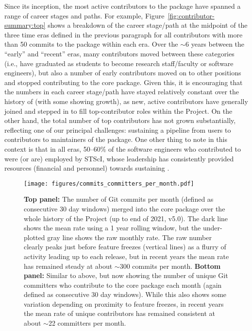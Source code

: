 \documentclass[modern]{aastex631}
\begin{document}
Since its inception, the most active contributors to the \astropypkg package
have spanned a range of career stages and paths.
For example, Figure~\ref{fig:contributor-summary:top} shows a breakdown of the
career stage/path at the midpoint of the three time eras defined in the previous
paragraph for all contributors with more than 50 commits to the \astropypkg
package within each era.
Over the $\sim$6 years between the ``early'' and ``recent'' eras, many
contributors moved between these categories (i.e., have graduated as students to
become research staff/faculty or software engineers), but also a number of
early contributors moved on to other positions and stopped contributing to the
core \astropypkg package.
Given this, it is encouraging that the numbers in each career stage/path have
stayed relatively constant over the history of \astropy (with some showing
growth), as new, active contributors have generally joined and stepped in to
fill top-contributor roles within the Project.
On the other hand, the total number of top contributors has not grown
substantially, reflecting one of our principal challenges: sustaining a pipeline
from users to contributors to maintainers of the package.
One other thing to note in this context is that in all eras, 50--60\% of the
software engineers who contributed to \astropypkg were (or are) employed by
STScI, whose leadership has consistently provided resources (financial and
personnel) towards sustaining \astropy.

\begin{figure}[t!]
    \begin{centering}
      \texttt{[image: figures/commits\_committers\_per\_month.pdf]}
        \caption{
            \textbf{Top panel:} The number of Git commits per month (defined as
            consecutive 30 day windows) merged into the \astropypkg core
            package over the whole history of the Project (up to end of 2021,
            v5.0).
            The dark line shows the mean rate using a 1 year rolling window, but
            the under-plotted gray line shows the raw monthly rate.
            The raw number clearly peaks just before feature freezes (vertical
            lines) as a flurry of activity leading up to each release, but in
            recent years the mean rate has remained steady at about $\sim$300
            commits per month.
            \textbf{Bottom panel:} Similar to above, but now showing the number
            of unique Git committers who contribute to the \astropypkg core
            package each month (again defined as consecutive 30 day windows).
            While this also shows some variation depending on proximity to
            feature freezes, in recent years the mean rate of unique
            contributors has remained consistent at about $\sim$22 committers
            per month.
        }
        \label{fig:contributor-summary:per-month}
    \end{centering}
\end{figure}
\end{document}
